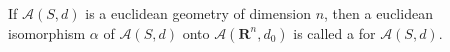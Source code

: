 If $\mathcal{A}(S, d)$ is a euclidean geometry of dimension $n$, then a euclidean isomorphism $\alpha$ of $\mathcal{A}(S, d)$ onto $\mathcal{A}(\mathbf{R}^n, d_0)$ is called a  for $\mathcal{A}(S, d)$.
